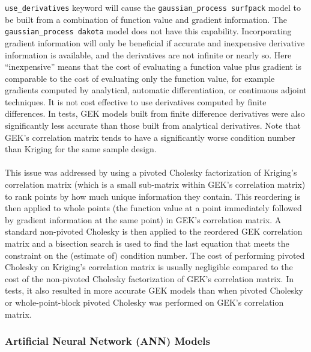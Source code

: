 \begin{itemize}
      \texttt{use\_derivatives}  keyword will cause the 
      \texttt{gaussian\_process surfpack} model to be built from a 
      combination of function value and gradient information.  The 
      \texttt{gaussian\_process dakota} model does not have this 
      capability.  Incorporating gradient information will only be 
      beneficial if accurate and inexpensive derivative information is 
      available, and the derivatives are not infinite or nearly so.  Here 
      ``inexpensive'' means that the cost of evaluating a function value 
      plus gradient is comparable to the cost of evaluating only the 
      function value, for example gradients computed by analytical, 
      automatic differentiation, or continuous adjoint techniques. It is 
      not cost effective to use derivatives computed by finite differences.
      In tests, GEK models built from finite difference derivatives were 
      also significantly less accurate than those built from analytical 
      derivatives.  Note that GEK's correlation matrix tends to have a 
      significantly worse condition number than Kriging for the same 
      sample design.\\ \\
      This issue was addressed by using a pivoted Cholesky 
      factorization of Kriging's correlation matrix (which is a small 
      sub-matrix within GEK's correlation matrix) to rank points by how 
      much unique information they contain. This reordering is then 
      applied to whole points (the function value at a point immediately 
      followed by gradient information at the same point) in GEK's 
      correlation matrix.  A standard non-pivoted Cholesky is then 
      applied to the reordered GEK correlation matrix and a bisection 
      search is used to find the last equation that meets the constraint on 
      the (estimate of) condition number. The cost of performing pivoted
      Cholesky on Kriging's correlation matrix is usually negligible 
      compared to the cost of the non-pivoted Cholesky factorization of 
      GEK's correlation matrix.  In tests, it also resulted in more
      accurate GEK models than when pivoted Cholesky or 
      whole-point-block pivoted Cholesky was performed on GEK's 
      correlation matrix.
\end{itemize}

\subsubsection{Artificial Neural Network (ANN) Models}\label{models:surf:ann}

